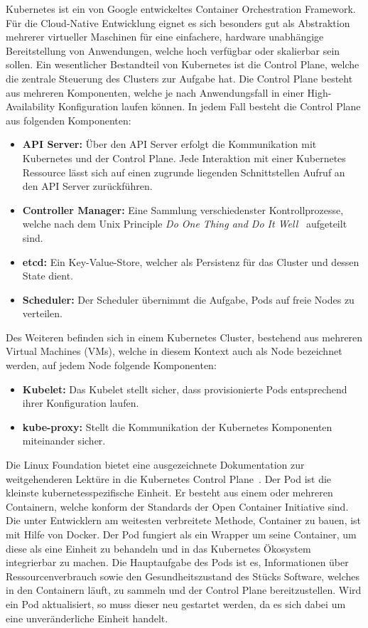 Kubernetes ist ein von Google entwickeltes Container Orchestration Framework.
Für die Cloud-Native Entwicklung eignet es sich besonders gut als Abstraktion mehrerer virtueller Maschinen für eine einfachere, hardware unabhängige Bereitstellung von Anwendungen, welche hoch verfügbar oder skalierbar sein sollen.
Ein wesentlicher Bestandteil von Kubernetes ist die Control Plane, welche die zentrale Steuerung des Clusters zur Aufgabe hat.
Die Control Plane besteht aus mehreren Komponenten, welche je nach Anwendungsfall in einer High-Availability Konfiguration laufen können.
In jedem Fall besteht die Control Plane aus folgenden Komponenten:
\begin{itemize}
    \item \textbf{API Server:} Über den API Server erfolgt die Kommunikation mit Kubernetes und der Control Plane.
    Jede Interaktion mit einer Kubernetes Ressource lässt sich auf einen zugrunde liegenden Schnittstellen Aufruf an den API Server zurückführen.
    \item \textbf{Controller Manager:} Eine Sammlung verschiedenster Kontrollprozesse, welche nach dem Unix Principle \emph{Do One Thing and Do It Well}~\cite{gancarz2003linux} aufgeteilt sind.
    \item \textbf{etcd:} Ein Key-Value-Store, welcher als Persistenz für das Cluster und dessen State dient.
    \item \textbf{Scheduler:} Der Scheduler übernimmt die Aufgabe, Pods auf freie Nodes zu verteilen.
\end{itemize}

Des Weiteren befinden sich in einem Kubernetes Cluster, bestehend aus mehreren Virtual Machines (VMs), welche in diesem Kontext auch als Node bezeichnet werden, auf jedem Node folgende Komponenten:

\begin{itemize}
    \item \textbf{Kubelet:} Das Kubelet stellt sicher, dass provisionierte Pods entsprechend ihrer Konfiguration laufen.
    \item \textbf{kube-proxy:} Stellt die Kommunikation der Kubernetes Komponenten miteinander sicher.
\end{itemize}
Die Linux Foundation bietet eine ausgezeichnete Dokumentation zur weitgehenderen Lektüre in die Kubernetes Control Plane~\cite{kubernetescomponents}.
Der Pod ist die kleinste kubernetesspezifische Einheit.
Er besteht aus einem oder mehreren Containern, welche konform der Standards der Open Container Initiative sind.
Die unter Entwicklern am weitesten verbreitete Methode, Container zu bauen, ist mit Hilfe von Docker.
Der Pod fungiert als ein Wrapper um seine Container, um diese als eine Einheit zu behandeln und in das Kubernetes Ökosystem integrierbar zu machen.
Die Hauptaufgabe des Pods ist es, Informationen über Ressourcenverbrauch sowie den Gesundheitszustand des Stücks Software, welches in den Containern läuft, zu sammeln und der Control Plane bereitzustellen.
Wird ein Pod aktualisiert, so muss dieser neu gestartet werden, da es sich dabei um eine unveränderliche Einheit handelt.

